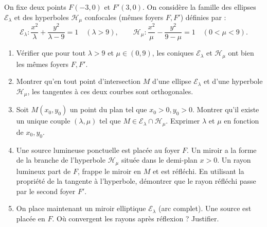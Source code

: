 \documentclass[11pt]{article}
\begin{document}
\begin{exercice}
On fixe deux points $F(-3,0)$ et $F'(3,0)$. On considère la famille des ellipses $\mathcal{E}_\lambda$ et des hyperboles $\mathcal{H}_\mu$ confocales (mêmes foyers $F,F'$) définies par :
\[
\mathcal{E}_\lambda : \frac{x^2}{\lambda} + \frac{y^2}{\lambda-9} = 1 \quad (\lambda > 9), \qquad
\mathcal{H}_\mu : \frac{x^2}{\mu} - \frac{y^2}{9-\mu} = 1 \quad (0 < \mu < 9).
\]
\begin{enumerate}
    \item Vérifier que pour tout $\lambda > 9$ et $\mu \in (0,9)$, les coniques $\mathcal{E}_\lambda$ et $\mathcal{H}_\mu$ ont bien les mêmes foyers $F,F'$.
    \item Montrer qu'en tout point d'intersection $M$ d'une ellipse $\mathcal{E}_\lambda$ et d'une hyperbole $\mathcal{H}_\mu$, les tangentes à ces deux courbes sont orthogonales.
    \item Soit $M(x_0,y_0)$ un point du plan tel que $x_0 > 0, y_0 > 0$. Montrer qu'il existe un unique couple $(\lambda, \mu)$ tel que $M \in \mathcal{E}_\lambda \cap \mathcal{H}_\mu$. Exprimer $\lambda$ et $\mu$ en fonction de $x_0, y_0$.
    \item Une source lumineuse ponctuelle est placée au foyer $F$. Un miroir a la forme de la branche de l'hyperbole $\mathcal{H}_\mu$ située dans le demi-plan $x > 0$. Un rayon lumineux part de $F$, frappe le miroir en $M$ et est réfléchi. En utilisant la propriété de la tangente à l'hyperbole, démontrer que le rayon réfléchi passe par le second foyer $F'$.
    \item On place maintenant un miroir elliptique $\mathcal{E}_\lambda$ (arc complet). Une source est placée en $F$. Où convergent les rayons après réflexion ? Justifier.
\end{enumerate}
\end{exercice}
\end{document}
